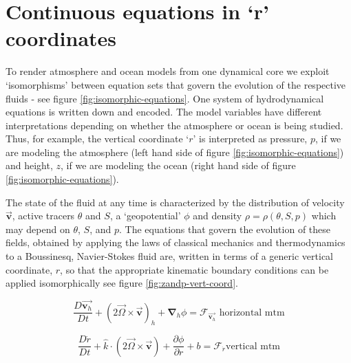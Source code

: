 


\section{Continuous equations in `r' coordinates}

To render atmosphere and ocean models from one dynamical core we exploit
`isomorphisms' between equation sets that govern the evolution of the
respective fluids - see figure \ref{fig:isomorphic-equations}. 
One system of hydrodynamical equations is written down
and encoded. The model variables have different interpretations depending on
whether the atmosphere or ocean is being studied. Thus, for example, the
vertical coordinate `$r$' is interpreted as pressure, $p$, if we are
modeling the atmosphere (left hand side of figure \ref{fig:isomorphic-equations})
and height, $z$, if we are modeling the ocean (right hand side of figure
\ref{fig:isomorphic-equations}).



The state of the fluid at any time is characterized by the distribution of
velocity $\vec{\mathbf{v}}$, active tracers $\theta $ and $S$, a
`geopotential' $\phi $ and density $\rho =\rho (\theta ,S,p)$ which may
depend on $\theta $, $S$, and $p$. The equations that govern the evolution
of these fields, obtained by applying the laws of classical mechanics and
thermodynamics to a Boussinesq, Navier-Stokes fluid are, written in terms of
a generic vertical coordinate, $r$, so that the appropriate
kinematic boundary conditions can be applied isomorphically
see figure \ref{fig:zandp-vert-coord}.



\begin{equation*}
\frac{D\vec{\mathbf{v}_{h}}}{Dt}+\left( 2\vec{\Omega}\times \vec{\mathbf{v}}
\right) _{h}+\mathbf{\nabla }_{h}\phi =\mathcal{F}_{\vec{\mathbf{v}_{h}}}
\text{ horizontal mtm} \label{eq:horizontal_mtm}
\end{equation*}

\begin{equation}
\frac{D\dot{r}}{Dt}+\widehat{k}\cdot \left( 2\vec{\Omega}\times \vec{\mathbf{
v}}\right) +\frac{\partial \phi }{\partial r}+b=\mathcal{F}_{\dot{r}}\text{
vertical mtm} \label{eq:vertical_mtm}
\end{equation}

